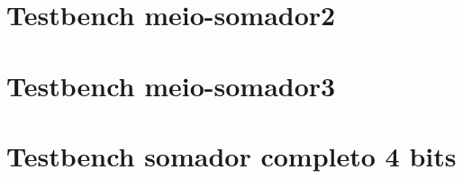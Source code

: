 
\begin{apendicesenv}

\partapendices

\chapter{Testbench meio-somador2}
	\label{apendice:meio_somador2}
	

\chapter{Testbench meio-somador3}
	\label{apendice:meio_somador3}
	

\chapter{Testbench somador completo 4 bits}
	\label{apendice:somador-completo}
	



\end{apendicesenv}
